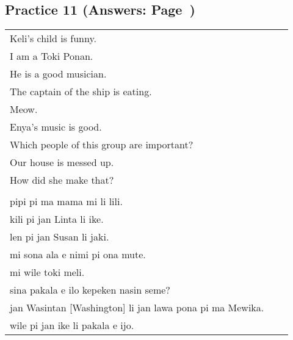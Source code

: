 \subsection*{Practice 11 (Answers: Page~\pageref{'pi'})}
%
\begin{supertabular}{p{5,5cm}|ll}
Keli's child is funny.    \\ %
I am a Toki Ponan.   \\  %
He is a good musician.   \\  %
The captain of the ship is eating.    \\ %
Meow.    \\ %
Enya's music is good.    \\ %
Which people of this group are important?    \\ %
Our house is messed up.    \\ %
How did she make that?    \\ %
 && \\ %
pipi pi ma mama mi li lili.  \\ %
kili pi jan Linta li ike.    \\ %
len pi jan Susan li jaki.    \\ %
mi sona ala e nimi pi ona mute.    \\ %
mi wile toki meli.    \\ %
sina pakala e ilo kepeken nasin seme?    \\ %
jan Wasintan [Washington] li jan lawa pona pi ma Mewika.  \\   %
wile pi jan ike li pakala e ijo.    \\ %
\end{supertabular}  
